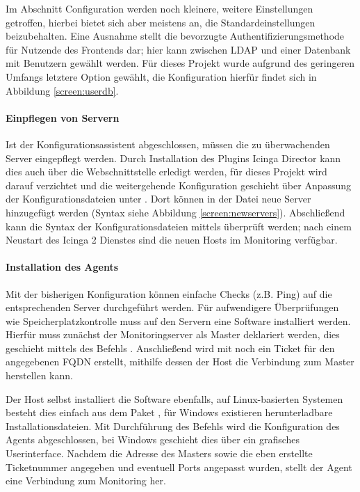 Im Abschnitt \glqq{}Configuration\grqq{} werden noch kleinere, weitere Einstellungen getroffen, hierbei bietet sich aber meistens an, die Standardeinstellungen beizubehalten. Eine Ausnahme stellt die bevorzugte Authentifizierungsmethode für Nutzende des Frontends dar; hier kann zwischen \ac{LDAP} und einer Datenbank mit Benutzern gewählt werden. Für dieses Projekt wurde aufgrund des geringeren Umfangs letztere Option gewählt, die Konfiguration hierfür findet sich in Abbildung \ref{screen:userdb}.

\paragraph{Einpflegen von Servern}
Ist der Konfigurationsassistent abgeschlossen, müssen die zu überwachenden Server eingepflegt werden. Durch Installation des Plugins \glqq{}Icinga Director\grqq{} kann dies auch über die Webschnittstelle erledigt werden, für dieses Projekt wird darauf verzichtet und die weitergehende Konfiguration geschieht über Anpassung der Konfigurationsdateien unter . Dort können in der Datei  neue Server hinzugefügt werden (Syntax siehe Abbildung \ref{screen:newservers}). Abschließend kann die Syntax der Konfigurationsdateien mittels  überprüft werden; nach einem Neustart des \glqq{}Icinga 2\grqq{} Dienstes sind die neuen Hosts im Monitoring verfügbar.

\paragraph{Installation des Agents}
Mit der bisherigen Konfiguration können einfache Checks (z.B. Ping) auf die entsprechenden Server durchgeführt werden. Für aufwendigere Überprüfungen wie Speicherplatzkontrolle muss auf den Servern eine Software installiert werden. Hierfür muss zunächst der Monitoringserver als \glqq{}Master\grqq{} deklariert werden, dies geschieht mittels des Befehls . Anschließend wird mit  noch ein \glqq{}Ticket\grqq{} für den angegebenen \ac{FQDN} erstellt, mithilfe dessen der Host die Verbindung zum Master herstellen kann.

Der Host selbst installiert die Software ebenfalls, auf Linux-basierten Systemen besteht dies einfach aus dem Paket , für Windows existieren herunterladbare Installationsdateien. Mit Durchführung des Befehls  wird die Konfiguration des Agents abgeschlossen, bei Windows geschieht dies über ein grafisches Userinterface. Nachdem die Adresse des Masters sowie die eben erstellte Ticketnummer angegeben und eventuell Ports angepasst wurden, stellt der Agent eine Verbindung zum Monitoring her.

